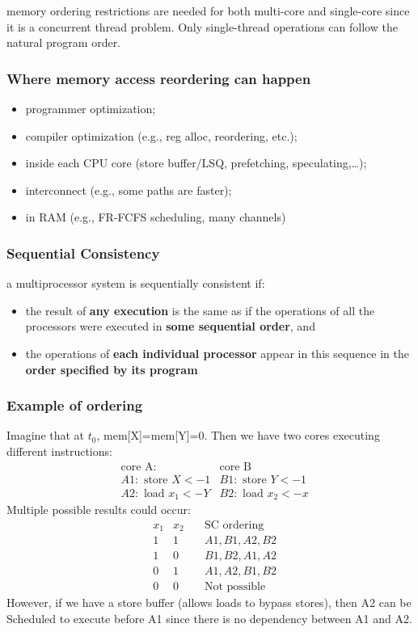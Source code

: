 \documentclass[letterpaper,12pt]{article}
\begin{document}
memory ordering restrictions are needed for both multi-core and single-core since it is a concurrent thread problem. Only single-thread operations can follow the natural program order.
\subsubsection{Where memory access reordering can happen}
\begin{itemize}
    \item programmer optimization;
    \item compiler optimization (e.g., reg alloc, reordering, etc.);
    \item inside each CPU core (store buffer/LSQ, prefetching, speculating,\ldots);
    \item interconnect (e.g., some paths are faster);
    \item in RAM (e.g., FR-FCFS scheduling, many channels)
\end{itemize}
\subsubsection{Sequential Consistency}
a multiprocessor system is sequentially consistent if:\begin{itemize}
    \item the result of \textbf{any execution} is the same as if the operations of all the processors were executed in \textbf{some sequential order}, and
    \item the operations of \textbf{each individual processor} appear in this sequence in the \textbf{order specified by its program}
\end{itemize}

\subsubsection{Example of ordering}
Imagine that at $t_0$, mem[X]=mem[Y]=0. Then we have two cores executing different instructions:\begin{align*}
     & \text{core A:}        & \text{core B}           \\
     & A1:\text{ store }X<-1 & B1: \text{ store }Y<-1  \\
     & A2:\text{ load }x_1<-Y & B2: \text{ load }x_2<-x
\end{align*}
Multiple possible results could occur:\begin{align*}
     & x_1 & x_2 \quad & \text{SC ordering}  \\
     & 1   & 1 \quad  & A1,B1,A2,B2         \\
     & 1   & 0 \quad  & B1,B2,A1,A2         \\
     & 0   & 1 \quad  & A1,A2,B1,B2         \\
     & 0   & 0 \quad  & \text{Not possible}
\end{align*}
However, if we have a store buffer (allows loads to bypass stores), then A2 can be Scheduled to execute before A1 since there is no dependency between A1 and A2.
\end{document}
